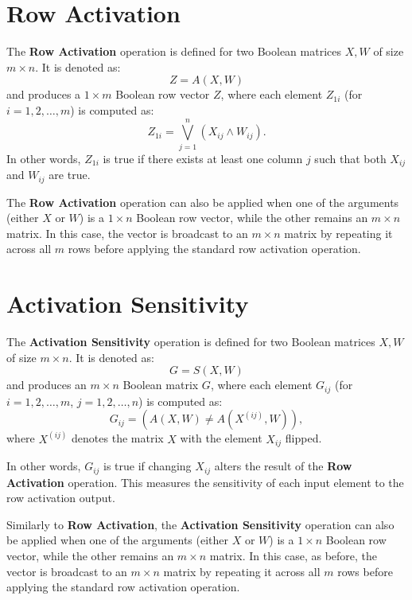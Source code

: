 \documentclass{article}
\begin{document}
\section{Row Activation}
The \textbf{Row Activation} operation is defined for two Boolean matrices \( X, W \) of size \( m \times n \). It is denoted as:
\[
Z = A(X, W)
\]
and produces a \( 1 \times m \) Boolean row vector \( Z \), where each element \( Z_{1i} \) (for \( i = 1, 2, \dots, m \)) is computed as:  
\[
Z_{1i} = \bigvee_{j=1}^{n} \left( X_{ij} \wedge W_{ij} \right).
\]
In other words, \( Z_{1i} \) is true if there exists at least one column \( j \) such that both \( X_{ij} \) and \( W_{ij} \) are true.

The \textbf{Row Activation} operation can also be applied when one of the arguments (either \( X \) or \( W \)) is a \( 1 \times n \) Boolean row vector, while the other remains an \( m \times n \) matrix. In this case, the vector is broadcast to an \( m \times n \) matrix by repeating it across all \( m \) rows before applying the standard row activation operation.

\section*{Activation Sensitivity}
The \textbf{Activation Sensitivity} operation is defined for two Boolean matrices \( X, W \) of size \( m \times n \). It is denoted as:
\[
G = S(X, W)
\]
and produces an \( m \times n \) Boolean matrix \( G \), where each element \( G_{ij} \) (for \( i = 1, 2, \dots, m \), \( j = 1, 2, \dots, n \)) is computed as:  
\[
G_{ij} = \left( A(X, W) \neq A(X^{(ij)}, W) \right),
\]
where \( X^{(ij)} \) denotes the matrix \( X \) with the element \( X_{ij} \) flipped.

In other words, \( G_{ij} \) is true if changing \( X_{ij} \) alters the result of the \textbf{Row Activation} operation. This measures the sensitivity of each input element to the row activation output.

Similarly to \textbf{Row Activation}, the \textbf{Activation Sensitivity} operation can also be applied when one of the arguments (either \( X \) or \( W \)) is a \( 1 \times n \) Boolean row vector, while the other remains an \( m \times n \) matrix. In this case, as before, the vector is broadcast to an \( m \times n \) matrix by repeating it across all \( m \) rows before applying the standard row activation operation.
\end{document}
